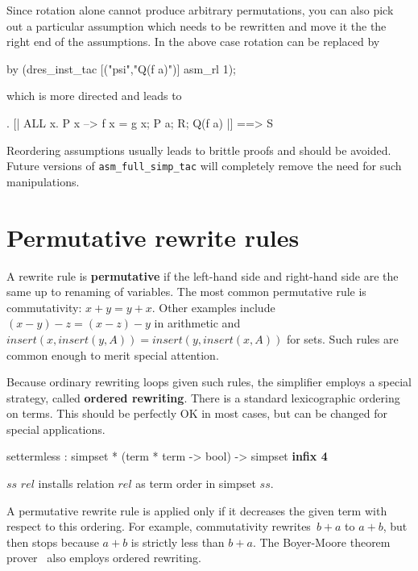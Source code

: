 Since rotation alone cannot produce arbitrary permutations, you can also pick
out a particular assumption which needs to be rewritten and move it the the
right end of the assumptions.  In the above case rotation can be replaced by
\begin{ttbox}
by (dres_inst_tac [("psi","Q(f a)")] asm_rl 1);
\end{ttbox}
which is more directed and leads to
\begin{ttbox}
{. [| ALL x. P x --> f x = g x; P a; R; Q(f a) |] ==> S}
\end{ttbox}

\begin{warn}
  Reordering assumptions usually leads to brittle proofs and should be
  avoided.  Future versions of \verb$asm_full_simp_tac$ will completely
  remove the need for such manipulations.
\end{warn}


\section{Permutative rewrite rules}

A rewrite rule is {\bf permutative} if the left-hand side and right-hand
side are the same up to renaming of variables.  The most common permutative
rule is commutativity: $x+y = y+x$.  Other examples include $(x-y)-z =
(x-z)-y$ in arithmetic and $insert(x,insert(y,A)) = insert(y,insert(x,A))$
for sets.  Such rules are common enough to merit special attention.

Because ordinary rewriting loops given such rules, the simplifier
employs a special strategy, called {\bf ordered
  rewriting}.  There is a standard
lexicographic ordering on terms.  This should be perfectly OK in most
cases, but can be changed for special applications.

\begin{ttbox}
settermless : simpset * (term * term -> bool) -> simpset \hfill{\bf infix 4}
\end{ttbox}
\begin{ttdescription}
  
\item[$ss$ \ttindexbold{settermless} $rel$] installs relation $rel$ as
  term order in simpset $ss$.

\end{ttdescription}

\medskip

A permutative rewrite rule is applied only if it decreases the given
term with respect to this ordering.  For example, commutativity
rewrites~$b+a$ to $a+b$, but then stops because $a+b$ is strictly less
than $b+a$.  The Boyer-Moore theorem prover~\cite{bm88book} also
employs ordered rewriting.

